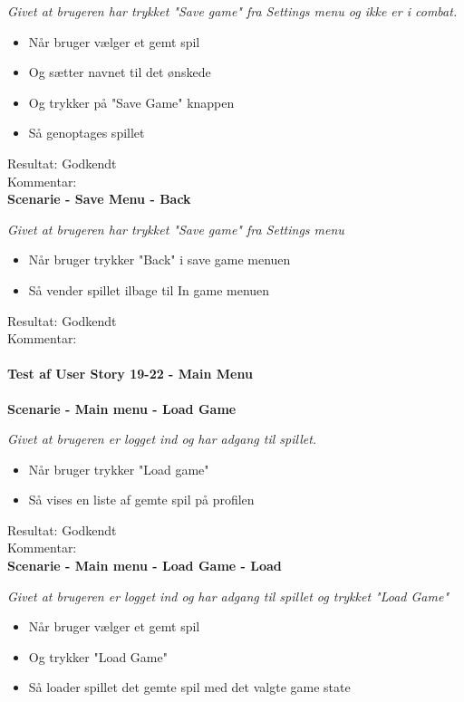 \textit{Givet at brugeren har trykket "Save game" fra Settings menu og ikke er i combat.}

\begin{itemize}
  \item Når bruger vælger et gemt spil
  \item Og sætter navnet til det ønskede
  \item Og trykker på "Save Game" knappen
  \item Så genoptages spillet
\end{itemize}

Resultat: Godkendt\\
Kommentar:\\

\textbf{Scenarie - Save Menu - Back}

\textit{Givet at brugeren har trykket "Save game" fra Settings menu}

\begin{itemize}
  \item Når bruger trykker "Back" i save game menuen
  \item Så vender spillet ilbage til In game menuen
\end{itemize}

Resultat: Godkendt\\
Kommentar:\\

\paragraph{Test af User Story 19-22 - Main Menu}

\textbf{Scenarie - Main menu - Load Game}

\textit{Givet at brugeren er logget ind og har adgang til spillet.}

\begin{itemize}
  \item Når bruger trykker "Load game"
  \item Så vises en liste af gemte spil på profilen
\end{itemize}

Resultat: Godkendt\\
Kommentar:\\

\textbf{Scenarie - Main menu - Load Game - Load}

\textit{Givet at brugeren er logget ind og har adgang til spillet og trykket "Load Game"}

\begin{itemize}
  \item Når bruger vælger et gemt spil
  \item Og trykker "Load Game"
  \item Så loader spillet det gemte spil med det valgte game state
\end{itemize}

